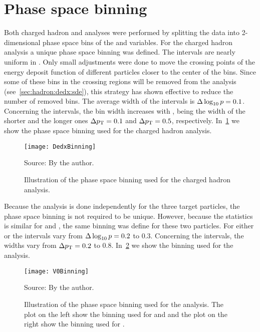 \section{Phase space binning}
\label{sec:hadron:binning}

Both charged hadron and \vzero analyses were performed
by splitting the data into 2-dimensional phase space bins
of the \pp and \pT variables. For the
charged hadron analysis a unique phase space
binning was defined. The \pp intervals 
are nearly uniform in \logp. Only small adjustments
were done to move the crossing points of the energy deposit function
of different particles closer to the center of the bins.
Since some of these bins in the crossing regions
will be removed from the analysis (see~\cref{sec:hadron:dedx:sde}),
this strategy has shown effective to reduce the number of
removed bins. The average width of the \logp intervals is
$\Delta\log_{10} p=0.1$. Concerning the \pT intervals, the bin width
increases with \pT, being the width of the shorter and the longer ones
$\Delta p_\text{T}=0.1$ and  $\Delta p_\text{T}=0.5$, respectively.  
In~\cref{fig:hadron:binning:dedx} we show the
phase space binning used for the charged hadron analysis.


\begin{figure}[!ht]
  \centering
  \texttt{[image: DedxBinning]}
  \caption{Illustration of the phase space binning used
    for the charged hadron analysis.}
  \label{fig:hadron:binning:dedx}
  \begin{center}
    \small Source: By the author. 
  \end{center}
\end{figure}

Because the \vzero analysis is done independently for the three target particles,
the phase space binning is not required to be unique.
However, because the statistics is similar for \lamb and \antilamb,
the same binning was define for these two particles.
For either \lambs or \kzeros the \pp intervals vary from
$\Delta\log_{10} p=0.2$ to $0.3$. Concerning the \pT intervals,
the widths vary from $\Delta p_\text{T} = 0.2$ to $0.8$.
In~\cref{fig:hadron:binning:vzero} we show the 
binning used for the \vzero analysis.

\begin{figure}[!ht]
  \centering
  \texttt{[image: V0Binning]}
  \caption{Illustration of the phase space binning used
    for the \vzero analysis. The plot on the left show the binning
    used for \lamb and \antilamb and the plot on the right
    show the binning used for \kzeros.}
  \label{fig:hadron:binning:vzero}
  \begin{center}
    \small Source: By the author. 
  \end{center}
\end{figure}


